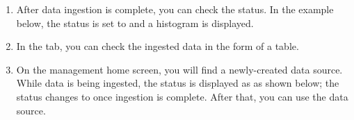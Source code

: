 \documentclass[letterpaper,10pt,english]{sphinxmanual}
\begin{document}
\begin{enumerate}
\begin{quote}
\begin{figure}[H]
\centering

\noindent{}
\end{figure}
\end{quote}

\item {} 
After data ingestion is complete, you can check the status. In the example below, the status is set to  and a histogram is displayed.
\begin{quote}

\begin{figure}[H]
\centering

\noindent{}
\end{figure}
\end{quote}

\item {} 
In the  tab, you can check the ingested data in the form of a table.
\begin{quote}

\begin{figure}[H]
\centering

\noindent{}
\end{figure}
\end{quote}

\item {} 
On the  management home screen, you will find a newly-created data source. While data is being ingested, the status is displayed as  as shown below; the status changes to  once ingestion is complete. After that, you can use the data source.
\begin{quote}

\begin{figure}[H]
\centering

\noindent{}
\end{figure}
\end{quote}

\end{enumerate}
\end{document}
